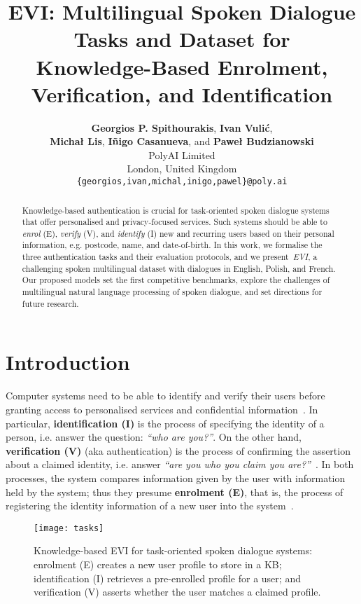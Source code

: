 \documentclass[11pt]{article}
\title{
EVI: Multilingual Spoken Dialogue Tasks and Dataset for \\
Knowledge-Based Enrolment, Verification, and Identification
}
\author{
    \vspace{2mm}
    \textbf{Georgios P. Spithourakis},
    \textbf{Ivan Vuli\'{c}}, \\
    \vspace{2mm}
    \textbf{Micha\l{} Lis},
    \textbf{I\~{n}igo Casanueva},
    {\normalfont and} \textbf{Pawe\l{} Budzianowski} \\
\vspace{2mm}
    PolyAI Limited \\
    London, United Kingdom \\
    \texttt{\small\{georgios,ivan,michal,inigo,pawel\}@poly.ai} \\
}
\date{}
\begin{document}
\maketitle







\begin{abstract}
Knowledge-based authentication is crucial for task-oriented spoken dialogue systems that offer personalised and privacy-focused services. Such systems should be able to \textit{enrol} (E), \textit{verify} (V), and \textit{identify} (I) new and recurring users based on their personal information, e.g. postcode, name, and date-of-birth. In this work, we formalise the three authentication tasks and their evaluation protocols, and we present~\textit{EVI}, a challenging spoken multilingual dataset with  dialogues in English, Polish, and French. Our proposed models set the first competitive benchmarks, explore the challenges of multilingual natural language processing of spoken dialogue, and set directions for future research.

\end{abstract}

\section{Introduction}
\label{sec:intro}
Computer systems need to be able to identify and verify their users
before granting access to personalised services and confidential information~\cite{braz2006security,o2003comparing}.
In particular,
\textbf{identification (I)} is the process of
specifying the identity of a person,
i.e. answer the question: \textit{``who are you?''}.
On the other hand,
\textbf{verification (V)} (aka authentication) is the process of
confirming the assertion about a claimed identity,
i.e. answer \textit{``are you who you claim you are?''}~\cite{jain2004introduction}.
In both processes,
the system compares information given by the user
with information held by the system;
thus they presume \textbf{enrolment (E)},
that is, the process of registering the identity information of a new user into the system~\cite{jain2004introduction}.

\begin{figure}[!t]
\centering
\texttt{[image: tasks]}
\caption{
Knowledge-based EVI for task-oriented spoken dialogue systems:
enrolment (E) creates a new user profile to store in a KB;
identification (I) retrieves a pre-enrolled profile for a user;
and verification (V) asserts whether the user matches a claimed profile.
}
\label{fig:tasks}
\end{figure}
 
\end{document}

